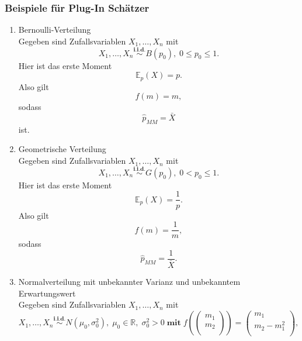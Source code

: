 \documentclass[10pt]{article}
\newcommand{\FZV}{X_1, \ldots, X_n} %
\newcommand{\IR}{\mathbb{R}} %
\newcommand{\EW}{\mathbb{E}} %
\newenvironment{BSP}[1][]
{\begin{Beispiel}[frametitle=#1]}{\end{Beispiel}}
\begin{document}
\subsubsection{Beispiele für Plug-In Schätzer}
	\begin{BSP}[Beispiel 1.3.2 (Plug-In-Schätzer)]
		\begin{enumerate}[label = (\roman*)]
			\item Bernoulli-Verteilung \\
			Gegeben sind Zufallsvariablen $\FZV$ mit
			\begin{equation*}
				\FZV \overset{\textbf{i.i.d.}}{\sim} B(p_0), \; 0 \leq p_0 \leq 1.
			\end{equation*} 
			Hier ist das erste Moment
			\begin{equation*}
				\EW_p(X)=p.
			\end{equation*}
			Also gilt
			\begin{equation*}
				f(m)=m,
			\end{equation*}
			sodass
			\begin{equation*}
				\hat{p}_{MM} = \bar{X} 
			\end{equation*}
			ist.
			
			\item Geometrische Verteilung \\
			Gegeben sind Zufallsvariablen $\FZV$ mit
			\begin{equation*}
				\FZV \overset{\textbf{i.i.d.}}{\sim} G(p_0), \; 0 < p_0 \leq 1.
			\end{equation*} 
			Hier ist das erste Moment
			\begin{equation*}
				\EW_p(X) = \frac{1}{p}.
			\end{equation*}
			Also gilt
			\begin{equation*}
				f(m)=\frac{1}{m},
			\end{equation*}
			sodass
			\begin{equation*}
				\hat{p}_{MM} = \frac{1}{\bar{X}}.
			\end{equation*}
			
			
			\item Normalverteilung mit unbekannter Varianz und unbekanntem Erwartungswert\\
			Gegeben sind Zufallsvariablen $\FZV$ mit
			\begin{equation*}
				\FZV \overset{\textbf{i.i.d.}} {\sim} N(\mu_0,\sigma_0^2),\; \mu_0 \in \IR, \; \sigma_0^2 >0 \; \textbf{mit} \; 	f(\left(
				\begin{array}{c}
					m_1\\
					m_2\\
				\end{array}
				\right)) = 
				\left(
				\begin{array}{c}
					m_1\\
					m_2 - m_1^2\\
				\end{array}
				\right),
			\end{equation*} 
			

\end{enumerate}
\end{BSP}
\end{document}
